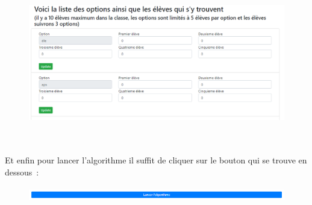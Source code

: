 \documentclass[12pt]{article}
\begin{document}

\begin{figure}[H]
	\begin{Center}
		\includegraphics[width=6.3in,height=2.8in]{./media/image6.png}
	\end{Center}
\end{figure}



\par


\vspace{\baselineskip}

\vspace{\baselineskip}
\begin{adjustwidth}{0.49in}{0.0in}
Et enfin pour lancer l’algorithme il suffit de cliquer sur le bouton qui se trouve en dessous :\par

\end{adjustwidth}




\begin{figure}[H]
	\begin{Center}
		\includegraphics[width=6.29in,height=0.28in]{./media/image7.png}
	\end{Center}
\end{figure}



\par
\end{document}
